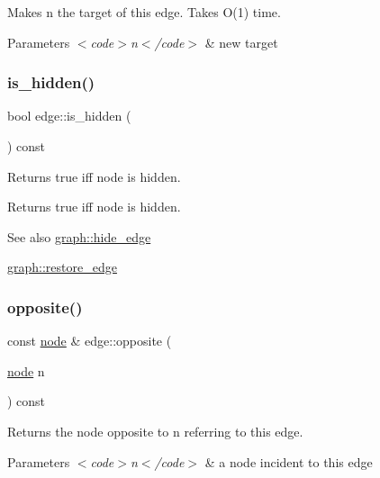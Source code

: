 Makes {\ttfamily n} the target of this edge. Takes O(1) time.


\begin{DoxyParams}{Parameters}
{\em $<$code$>$n$<$/code$>$} & new target \\
\hline
\end{DoxyParams}
\mbox{\label{classedge_ab6d6192a90b1cb77ce9dee2de78d9743}} 
\subsubsection{\texorpdfstring{is\+\_\+hidden()}{is\_hidden()}}
{\footnotesize\ttfamily bool edge\+::is\+\_\+hidden (\begin{DoxyParamCaption}{ }\end{DoxyParamCaption}) const}

Returns true iff node is hidden.

\begin{DoxyReturn}{Returns}
true iff node is hidden. 
\end{DoxyReturn}
\begin{DoxySeeAlso}{See also}
\mbox{\hyperlink{classgraph_ab2f8520bcac080d73c55228fecc61825}{graph\+::hide\+\_\+edge}} 

\mbox{\hyperlink{classgraph_a2e5426682a0897b9f9104b019970bedc}{graph\+::restore\+\_\+edge}} 
\end{DoxySeeAlso}
\mbox{\label{classedge_ab64dc3659c9003337b0c3749a8b879cf}} 
\subsubsection{\texorpdfstring{opposite()}{opposite()}}
{\footnotesize\ttfamily const \mbox{\hyperlink{classnode}{node}} \& edge\+::opposite (\begin{DoxyParamCaption}\item[{\mbox{\hyperlink{classnode}{node}}}]{n }\end{DoxyParamCaption}) const}

Returns the node opposite to {\ttfamily n} referring to this edge.


\begin{DoxyParams}{Parameters}
{\em $<$code$>$n$<$/code$>$} & a node incident to this edge \\
\hline
\end{DoxyParams}
\mbox{\label{classedge_ad62516eb40dbee9f57a2078cfd97b4c9}} 
